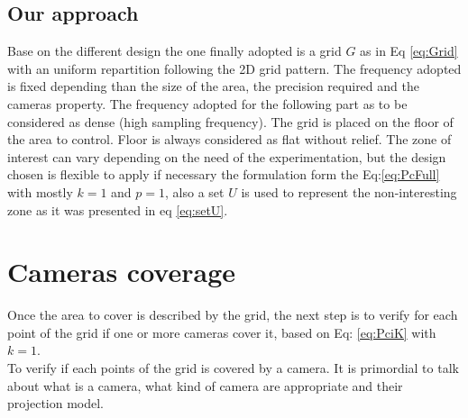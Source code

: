 \begin{table}[!h]
 \caption{Sum-up of the grid map.}\label{tab:mapSumUp}
\end{table}	
 
 
\subsection{Our approach}
 Base on the different design the one finally adopted is a grid $G$ as in Eq \ref{eq:Grid} with an uniform repartition following the 2D grid pattern. The frequency adopted is fixed depending than the size of the area, the precision required and the cameras property. The frequency adopted for the following part as to be considered as dense (high sampling frequency).
  The grid is placed on the floor of the area to control. Floor is always considered as flat without relief. The zone of interest can vary depending on the need of the experimentation, but the design chosen is flexible to apply if necessary the formulation form the Eq:\ref{eq:PcFull} with mostly $k=1$ and $p=1$, also a set $U$ is used to represent the non-interesting zone as it was presented in eq \ref{eq:setU}.

\section{Cameras coverage}\label{sec:CamerasCoverage}


Once the area to cover is described by the grid, the next step is to verify for each point of the grid if one or more cameras cover it, based on Eq: \ref{eq:PciK} with $k=1$.\\
To verify if each points of the grid is covered by a camera. It is primordial to talk about what is a camera, what kind of camera are appropriate and their projection model. 

